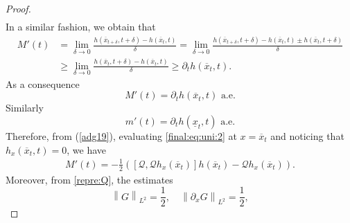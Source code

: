 \documentclass[final,11pt,a4paper,reqno]{amsart}
\newcommand{\norm}[1]{\left\| #1 \right\|}
\newcommand{\pa}{\partial}
\theoremstyle{definition}
\begin{document}
\begin{proof}
\begin{align*}
\end{align*}
In a similar fashion, we obtain that
\begin{align*}
M'(t)&=\lim_{\delta\rightarrow0} \frac{h(\overline{x}_{t+\delta},t+\delta)-h(\overline{x}_t,t)}{\delta}=\lim_{\delta\rightarrow0} \frac{h(\overline{x}_{t+\delta},t+\delta)-h(\overline{x}_t,t)\pm h(\overline{x}_{t},t+\delta)}{\delta}\\
&\geq\lim_{\delta\rightarrow0} \frac{h(\overline{x}_{t},t+\delta)-h(\overline{x}_{t},t)}{\delta}\geq \partial_t h(\overline{x}_{t},t).
\end{align*}
As a consequence
\begin{equation}\label{adg19}
M'(t)=\partial_t h(\overline{x}_{t},t) \text{ a.e.}
\end{equation}
Similarly
$$
m'(t)=\partial_t h(\underline{x}_{t},t) \text{ a.e.}
$$
Therefore, from (\ref{adg19}), evaluating \eqref{final:eq:uni:2} at $x=\overline{x}_{t}$ and noticing that $h_{x}(\overline{x}_{t},t)=0$, we have
\begin{align}\label{adg20}
M'(t)=-\frac{1}{2}\left([\mathscr{Q},\mathscr{Q}h_{x}(\overline{x}_{t})]h(\overline{x}_{t}) - \mathscr{Q}h_{x}(\overline{x}_{t})\right). 
\end{align}
Moreover, from \eqref{repre:Q}, the estimates 
\begin{equation*}
\norm{G}_{L^{2}}=\frac{1}{2}, \quad \norm{\pa_{x}G}_{L^{2}}= \frac{1}{2},
\end{equation*}


\end{proof}
\end{document}
